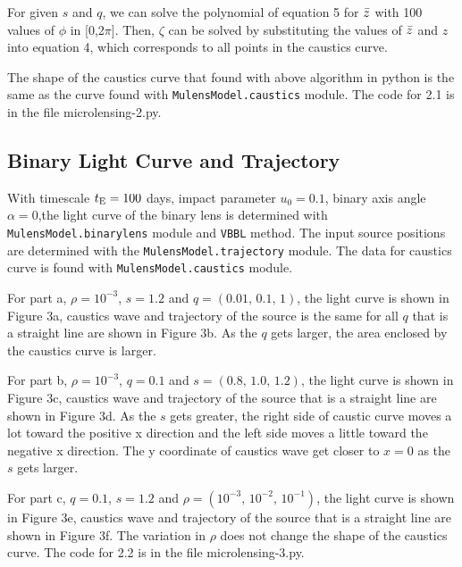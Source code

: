 \documentclass[preprint]{aastex63}
\begin{document}
For given $s$ and $q$, we can solve the polynomial of equation 5 for $\Bar{z}$ with 100 values of $\phi$ in [0,2$\pi$]. Then, $\zeta$ can be solved by substituting the values of $\Bar{z}$ and $z$ into equation 4, which corresponds to all points in the caustics curve.\par
The shape of the caustics curve that found with above algorithm in python is the same as the curve found with \texttt{MulensModel.caustics} module. The code for 2.1 is in the file microlensing-2.py.\par


\bigskip
\subsection{Binary Light Curve and Trajectory}
With timescale $t_{\rm E}=100$ days, impact parameter $u_0=0.1$, binary axis angle $\alpha=0$,the light curve of the binary lens is determined with \texttt{MulensModel.binarylens} module and \texttt{VBBL} method. The input source positions are determined with the \texttt{MulensModel.trajectory} module. The data for caustics curve is found with \texttt{MulensModel.caustics} module.\par
For part a, $\rho=10^{-3}$, $s=1.2$ and $q=(0.01,\,0.1,\,1)$, the light curve is shown in Figure 3a, caustics wave and trajectory of the source is the same for all $q$ that is a straight line are shown in Figure 3b. As the $q$ gets larger, the area enclosed by the caustics curve is larger.\par
For part b, $\rho=10^{-3}$, $q=0.1$ and $s=(0.8,\,1.0,\,1.2)$, the light curve is shown in Figure 3c, caustics wave and trajectory of the source that is a straight line are shown in Figure 3d. As the $s$ gets greater, the right side of caustic curve moves a lot toward the positive x direction and the left side moves a little toward the negative x direction. The y coordinate of caustics wave get closer to $x=0$ as the $s$ gets larger.\par
For part c, $q=0.1$, $s=1.2$ and $\rho=(10^{-3},\,10^{-2},\,10^{-1})$, the light curve is shown in Figure 3e, caustics wave and trajectory of the source that is a straight line are shown in Figure 3f. The variation in $\rho$ does not change the shape of the caustics curve. The code for 2.2 is in the file microlensing-3.py.\par
\end{document}
